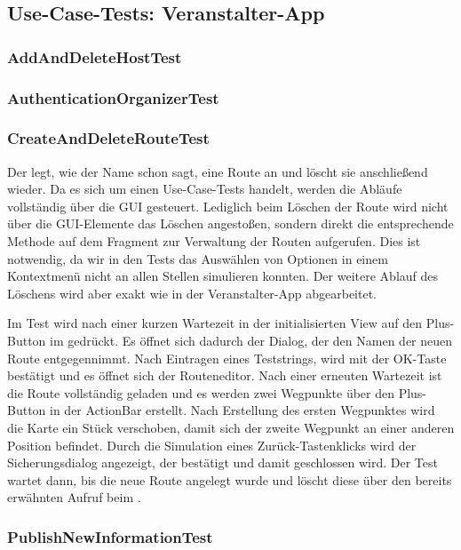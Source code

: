 \subsection{Use-Case-Tests: Veranstalter-App}
\subsubsection{AddAndDeleteHostTest}

\subsubsection{AuthenticationOrganizerTest}

\subsubsection{CreateAndDeleteRouteTest}
Der  legt, wie der Name schon sagt, eine Route an und löscht sie anschließend wieder. Da es sich um einen Use-Case-Tests handelt, werden die Abläufe vollständig über die GUI gesteuert. Lediglich beim Löschen der Route wird nicht über die GUI-Elemente das Löschen angestoßen, sondern direkt die entsprechende Methode auf dem Fragment zur Verwaltung der Routen aufgerufen. Dies ist notwendig, da wir in den Tests das Auswählen von Optionen in einem Kontextmenü nicht an allen Stellen simulieren konnten. Der weitere Ablauf des Löschens wird aber exakt wie in der Veranstalter-App abgearbeitet.

Im Test wird nach einer kurzen Wartezeit in der initialisierten View auf den Plus-Button im  gedrückt. Es öffnet sich dadurch der Dialog, der den Namen der neuen Route entgegennimmt. Nach Eintragen eines Teststrings, wird mit der OK-Taste bestätigt und es öffnet sich der Routeneditor. Nach einer erneuten Wartezeit ist die Route vollständig geladen und es werden zwei Wegpunkte über den Plus-Button in der ActionBar erstellt. Nach Erstellung des ersten Wegpunktes wird die Karte ein Stück verschoben, damit sich der zweite Wegpunkt an einer anderen Position befindet. Durch die Simulation eines Zurück-Tastenklicks wird der Sicherungsdialog angezeigt, der bestätigt und damit geschlossen wird. Der Test wartet dann, bis die neue Route angelegt wurde und löscht diese über den bereits erwähnten Aufruf beim .

\subsubsection{PublishNewInformationTest}
